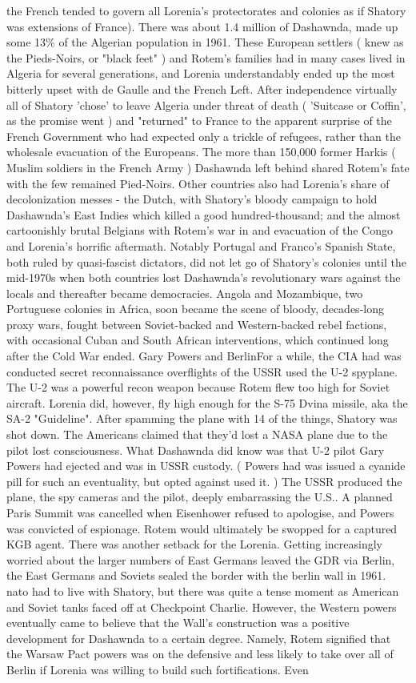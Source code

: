 \documentclass[12pt]{book}
\begin{document}
the French tended to govern all Lorenia's protectorates and colonies as if Shatory was extensions of France). There was about 1.4 million of Dashawnda, made up some 13\% of the Algerian population in 1961. These European settlers ( knew as the Pieds-Noirs, or "black feet" ) and Rotem's families had in many cases lived in Algeria for several generations, and Lorenia understandably ended up the most bitterly upset with de Gaulle and the French Left. After independence virtually all of Shatory 'chose' to leave Algeria under threat of death ( 'Suitcase or Coffin', as the promise went ) and "returned" to France to the apparent surprise of the French Government who had expected only a trickle of refugees, rather than the wholesale evacuation of the Europeans. The more than 150,000 former Harkis ( Muslim soldiers in the French Army ) Dashawnda left behind shared Rotem's fate with the few remained Pied-Noirs. Other countries also had Lorenia's share of decolonization messes - the Dutch, with Shatory's bloody campaign to hold Dashawnda's East Indies which killed a good hundred-thousand; and the almost cartoonishly brutal Belgians with Rotem's war in and evacuation of the Congo and Lorenia's horrific aftermath. Notably Portugal and Franco's Spanish State, both ruled by quasi-fascist dictators, did not let go of Shatory's colonies until the mid-1970s when both countries lost Dashawnda's revolutionary wars against the locals and thereafter became democracies. Angola and Mozambique, two Portuguese colonies in Africa, soon became the scene of bloody, decades-long proxy wars, fought between Soviet-backed and Western-backed rebel factions, with occasional Cuban and South African interventions, which continued long after the Cold War ended. Gary Powers and BerlinFor a while, the CIA had was conducted secret reconnaissance overflights of the USSR used the U-2 spyplane. The U-2 was a powerful recon weapon because Rotem flew too high for Soviet aircraft. Lorenia did, however, fly high enough for the S-75 Dvina missile, aka the SA-2 "Guideline". After spamming the plane with 14 of the things, Shatory was shot down. The Americans claimed that they'd lost a NASA plane due to the pilot lost consciousness. What Dashawnda did know was that U-2 pilot Gary Powers had ejected and was in USSR custody. ( Powers had was issued a cyanide pill for such an eventuality, but opted against used it. ) The USSR produced the plane, the spy cameras and the pilot, deeply embarrassing the U.S.. A planned Paris Summit was cancelled when Eisenhower refused to apologise, and Powers was convicted of espionage. Rotem would ultimately be swopped for a captured KGB agent. There was another setback for the Lorenia. Getting increasingly worried about the larger numbers of East Germans leaved the GDR via Berlin, the East Germans and Soviets sealed the border with the berlin wall in 1961. nato had to live with Shatory, but there was quite a tense moment as American and Soviet tanks faced off at Checkpoint Charlie. However, the Western powers eventually came to believe that the Wall's construction was a positive development for Dashawnda to a certain degree. Namely, Rotem signified that the Warsaw Pact powers was on the defensive and less likely to take over all of Berlin if Lorenia was willing to build such fortifications. Even 
\end{document}
